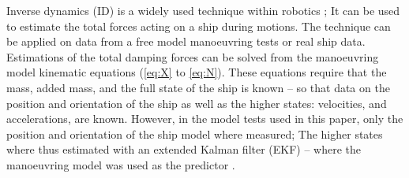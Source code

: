 Inverse dynamics (ID) is a widely used technique within robotics \citep{faber_inverse_2018}; It can be used to estimate the total forces acting on a ship during motions. The technique can be applied on data from a free model manoeuvring tests or real ship data. 
Estimations of the total damping forces can be solved from the manoeuvring model kinematic equations  (\autoref{eq:X} to \autoref{eq:N}). These equations require that the mass, added mass, and the full state of the ship is known -- so that data on the position and orientation of the ship as well as the higher states: velocities, and accelerations, are known.
However, in the model tests used in this paper, only the position and orientation of the ship model where measured;
The higher states where thus estimated with an extended Kalman filter (EKF) -- where the manoeuvring model was used as the predictor \citep{alexandersson_wpcc_2022}.

